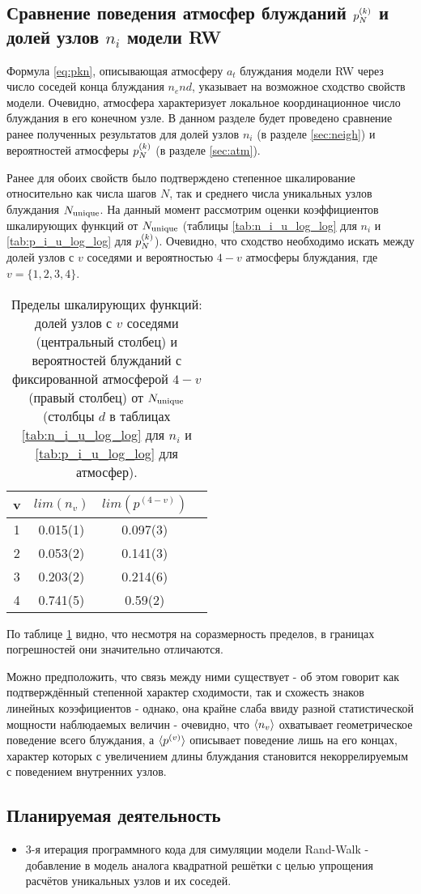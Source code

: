\newpage

\subsection{Сравнение поведения атмосфер блужданий $p^{(k)}_N$ и долей узлов $n_i$ модели RW}

Формула \eqref{eq:pkn}, описывающая атмосферу $a_t$ блуждания модели RW через число соседей конца блуждания $n_end$, указывает на возможное сходство свойств модели.
Очевидно, атмосфера характеризует локальное координационное число блуждания в его конечном узле. 
В данном разделе будет проведено сравнение ранее полученных результатов для долей узлов $n_i$ (в разделе \ref{sec:neigh}) и вероятностей атмосферы $p^{(k)}_N$ (в разделе \ref{sec:atm}). 

Ранее для обоих свойств было подтверждено степенное шкалирование относительно как числа шагов $N$, так и среднего числа уникальных узлов блуждания $N_{\textup{unique}}$.
На данный момент рассмотрим оценки коэффициентов шкалирующих функций от $N_{\textup{unique}}$ (таблицы \ref{tab:n_i_u_log_log} для $n_i$ и \ref{tab:p_i_u_log_log} для $p^{(k)}_N$).
Очевидно, что сходство необходимо искать между долей узлов с $v$ соседями и вероятностью $4-v$ атмосферы блуждания, где $v=\{1,2,3,4\}$.

\begin{table}[h]
\centering
\begin{tabular}{|c|c|c|c|}
\hline
v & $lim(n_v)$ & $lim(p^{(4-v)})$ \\ \hline
1 & 0.015(1) & 0.097(3) \\ \hline
2 & 0.053(2) & 0.141(3) \\ \hline
3 & 0.203(2) & 0.214(6) \\ \hline
4 & 0.741(5) & 0.59(2) \\ \hline
\end{tabular}
\caption{Пределы шкалирующих функций: долей узлов с $v$ соседями (центральный столбец) и вероятностей блужданий с фиксированной атмосферой $4-v$ (правый столбец) от $N_{\textup{unique}}$ (столбцы $d$ в таблицах \ref{tab:n_i_u_log_log} для $n_i$ и \ref{tab:p_i_u_log_log} для атмосфер).}
\label{tab:n_vs_atm_d}
\end{table}

По таблице \ref{tab:n_vs_atm_d} видно, что несмотря на соразмерность пределов, в границах погрешностей они значительно отличаются. 

Можно предположить, что связь между ними существует - об этом говорит как подтверждённый степенной характер сходимости, так и схожесть знаков линейных коээфициентов - однако, она крайне слаба ввиду разной статистической мощности наблюдаемых величин - очевидно, что $\langle n_v \rangle$ охватывает геометрическое поведение всего блуждания, а $\langle p^{(v)} \rangle$ описывает поведение лишь на его концах, характер которых с увеличением длины блуждания становится некоррелируемым с поведением внутренних узлов.

\newpage

\subsection{Планируемая деятельность}

\begin{itemize}
\item 3-я итерация программного кода для симуляции модели Rand-Walk - добавление в модель аналога квадратной решётки с целью упрощения расчётов уникальных узлов и их соседей.
\end{itemize}
